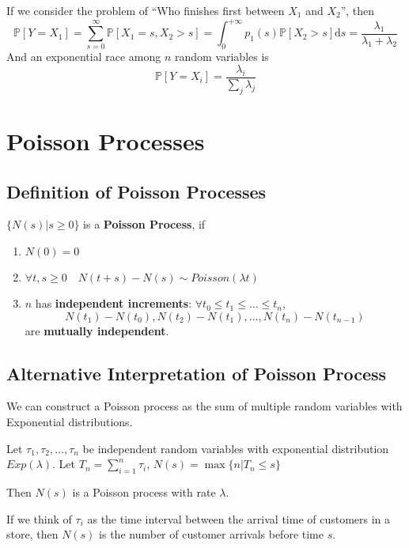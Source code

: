         If we consider the problem of ``Who finishes first between $X_1$ and $X_2$'', then
        \[ \mathbb{P}[Y=X_1]=\sum_{s=0}^\infty \mathbb{P}[X_1=s,X_2>s] = \int_0^{+\infty}p_1(s)\mathbb{P}[X_2>s]\mathrm{d}s = \frac{\lambda_1}{\lambda_1 + \lambda_2} \]
        And an exponential race among $n$ random variables is
        \[ \mathbb{P}[Y=X_i] = \frac{\lambda_i}{\sum_j \lambda_j} \]


\section{Poisson Processes}

    \subsection{Definition of Poisson Processes}
    \begin{definition}\label{Def:PoissonProcess}
        $\{N(s)|s \ge 0\}$ is a \textbf{Poisson Process}, if
        \begin{enumerate}
            \item $N(0)=0$
            \item $\forall t, s \ge 0 \quad N(t+s) - N(s) \sim Poisson(\lambda t)$
            \item $n$ has \textbf{independent increments}: $\forall t_0 \le t_1 \le \dots \le t_n$,
            \[ N(t_1)-N(t_0), N(t_2)-N(t_1), \dots, N(t_n)-N(t_{n-1}) \]
            are \textbf{mutually independent}.
        \end{enumerate}
    \end{definition}

    \subsection{Alternative Interpretation of Poisson Process}
    We can construct a Poisson process as the sum of multiple random variables with Exponential distributions.
    \begin{proposition}\label{Prop:AltDefOfPoissonProcess}
        Let $\tau_1,\tau_2,\dots,\tau_n$ be independent random variables with exponential distribution $Exp(\lambda)$. Let $T_n=\sum_{i=1}^n\tau_i$, $N(s)=\max\{n|T_n \le s\}$

        Then $N(s)$ is a Poisson process with rate $\lambda$.
    \end{proposition}
    \begin{remark}
        If we think of $\tau_i$ as the time interval between the arrival time of customers in a store, then $N(s)$ is the number of customer arrivals before time $s$.
    \end{remark}

